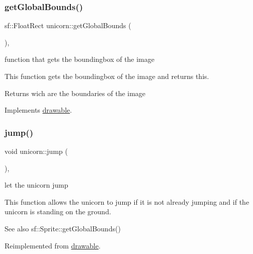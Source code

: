 \subsubsection{\texorpdfstring{get\+Global\+Bounds()}{getGlobalBounds()}}
{\footnotesize\ttfamily sf\+::\+Float\+Rect unicorn\+::get\+Global\+Bounds (\begin{DoxyParamCaption}{ }\end{DoxyParamCaption})\hspace{0.3cm}{\ttfamily [override]}, {\ttfamily [virtual]}}



function that gets the boundingbox of the image 

This function gets the boundingbox of the image and returns this.

\begin{DoxyReturn}{Returns}
wich are the boundaries of the image 
\end{DoxyReturn}


Implements \hyperlink{classdrawable_ae013ac0be47538be9ce885d6642daf73}{drawable}.

\mbox{\label{classunicorn_a07d5ca4e66632c0e871221a27146805a}} 
\subsubsection{\texorpdfstring{jump()}{jump()}}
{\footnotesize\ttfamily void unicorn\+::jump (\begin{DoxyParamCaption}{ }\end{DoxyParamCaption})\hspace{0.3cm}{\ttfamily [override]}, {\ttfamily [virtual]}}



let the unicorn jump 

This function allows the unicorn to jump if it is not already jumping and if the unicorn is standing on the ground.

\begin{DoxySeeAlso}{See also}
sf\+::\+Sprite\+::get\+Global\+Bounds() 
\end{DoxySeeAlso}


Reimplemented from \hyperlink{classdrawable_ac39691470b7874f5dec59efe649d3981}{drawable}.

\mbox{\label{classunicorn_a162f200a68342f7bc0baaf17c8cf3f9f}} 
